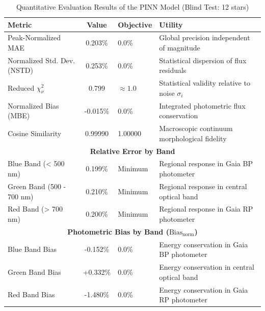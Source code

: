 
\begin{table}[htpb]
\centering
\caption{Quantitative Evaluation Results of the PINN Model (Blind Test: 12 stars)}
\label{tab:pinn_evaluation}
\begin{tabular}{lcll}
\hline
\textbf{Metric} & \textbf{Value} & \textbf{Objective} & \textbf{Utility} \\
\hline
Peak-Normalized MAE & 0.203\% & 0.0\% & Global precision independent of magnitude \\
Normalized Std. Dev. (NSTD) & 0.253\% & 0.0\% & Statistical dispersion of flux residuals \\
Reduced $\chi^2_\nu$ & 0.799 & $\approx 1.0$ & Statistical validity relative to noise $\sigma_i$ \\
Normalized Bias (MBE) & -0.015\% & 0.0\% & Integrated photometric flux conservation \\
Cosine Similarity & 0.99990 & 1.00000 & Macroscopic continuum morphological fidelity \\
\hline
\multicolumn{4}{c}{\textbf{Relative Error by Band}} \\
\hline
Blue Band (< 500 nm) & 0.199\% & Minimum & Regional response in Gaia BP photometer \\
Green Band (500 - 700 nm) & 0.210\% & Minimum & Regional response in central optical band \\
Red Band (> 700 nm) & 0.200\% & Minimum & Regional response in Gaia RP photometer \\
\hline
\multicolumn{4}{c}{\textbf{Photometric Bias by Band ($\text{Bias}_{\text{norm}}$)}} \\
\hline
Blue Band Bias & -0.152\% & 0.0\% & Energy conservation in Gaia BP photometer \\
Green Band Bias & +0.332\% & 0.0\% & Energy conservation in central optical band \\
Red Band Bias & -1.480\% & 0.0\% & Energy conservation in Gaia RP photometer \\
\hline
\end{tabular}
\end{table}
